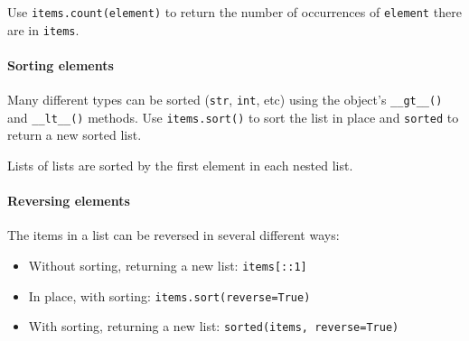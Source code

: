 Use \texttt{items.count(element)} to return the number of occurrences of \texttt{element} there are in \texttt{items}.

\paragraph{Sorting elements}\label{par:sorting_elements}

Many different types can be sorted (\texttt{str}, \texttt{int}, etc) using the object's \texttt{__gt__()} and \texttt{__lt__()} methods.
Use \texttt{items.sort()} to sort the list in place and \texttt{sorted} to return a new sorted list.

\begin{note}
	Lists of lists are sorted by the first element in each nested list.
\end{note}

\paragraph{Reversing elements}\label{par:reversing_elements}

The items in a list can be reversed in several different ways:

\begin{itemize}
	\item Without sorting, returning a new list: \texttt{items[::1]}
	\item In place, with sorting: \texttt{items.sort(reverse=True)}
	\item With sorting, returning a new list: \texttt{sorted(items, reverse=True)}
\end{itemize}


